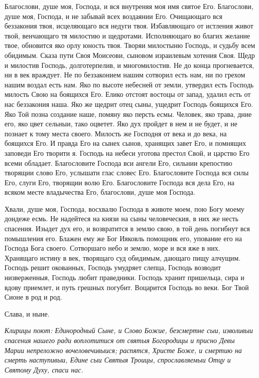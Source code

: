 Благослови, душе моя, Господа, и вся внутреняя моя имя святое Его. Благослови, душе моя, Господа, и не забывай всех воздаянии Его. Очищающаго вся беззакония твоя, исцеляющаго вся недуги твоя. Избавляющаго от истления живот твой, венчающаго тя милостию и щедротами. Исполняющаго во благих желание твое, обновится яко орлу юность твоя. Творяи милостыню Господь, и судьбу всем обидимым. Сказа пути Своя Моисеови, сыновом израилевым хотения Своя. Щедр и милостив Господь, долготерпелив, и многомилостив. Не до конца прогневается, ни в век враждует. Не по беззаконием нашим сотворил есть нам, ни по грехом нашим воздал есть нам. Яко по высоте небесней от земли, утвердил есть Господь милость Свою на боящихся Его. Елико отстоят востоцы от запад, удалил есть от нас беззакония наша. Яко же щедрит отец сыны, ущедрит Господь боящихся Его. Яко Той позна создание наше, помяну яко персть есмы. Человек, яко трава, дние его, яко цвет сельныи, тако оцветет. Яко дух пройдет в нем и не будет, и не познает к тому места своего. Милость же Господня от века и до века, на боящихся Его. И правда Его на сынех сынов, хранящих завет Его, и помнящих заповеди Его творити я. Господь на небеси уготова престол Свой, и царство Его всеми обладает. Благословите Господа вси ангели Его, сильнии крепостию творящии слово Его, услышати глас словес Его. Благословите Господа вся силы Его, слуги Его, творящии волю Его. Благословите Господа вся дела Его, на всяком месте владычества Его, благослови, душе моя Господа.




Хвали, душе моя, Господа, восхвалю Господа в животе моем, пою Богу моему дондеже есмь. Не надейтеся на князи на сыны человеческия, в них же несть спасения. Изыдет дух его, и возвратится в землю свою, в той день погибнут вся помышления его. Блажен ему же Бог Ияковль помощник его, упование его на Господа Бога своего. Сотворшаго небо и землю, море и вся яже в них. Хранящаго истину в век, творящаго суд обидимым, дающаго пищу алчущим. Господь решит окованных, Господь умудряет слепца, Господь возводит низверженныя, Господь любит праведники. Господь хранит пришельца, сира и вдову приемлет, и путь грешных погубит. Воцарится Господь во веки. Бог Твой Сионе в род и род. 

Слава, и ныне.


\itshape Клирицы поют:\normalfont{} Единородный Сыне, и Слово Божие, безсмертне сыи, изволивыи спасения нашего ради воплотитися от святыя Богородицы и присно Девы Марии непреложно вочеловечивыися; распятся, Христе Боже, и смертию на смерть наступивыи, Едине сыи Святыя Троицы, спрославляемыи Отцу и Святому Духу, спаси нас.


